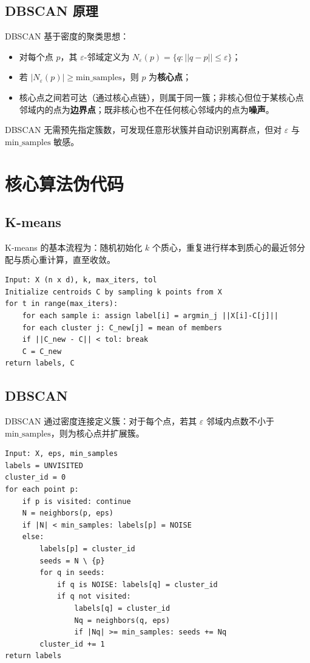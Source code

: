\subsection{DBSCAN 原理}
DBSCAN 基于密度的聚类思想：
\begin{itemize}
    \item 对每个点 $p$，其 $\varepsilon$-邻域定义为 $N_\varepsilon(p)=\{q: ||q-p||\le\varepsilon\}$；
    \item 若 $|N_\varepsilon(p)|\ge\mathrm{min\_samples}$，则 $p$ 为\textbf{核心点}；
    \item 核心点之间若可达（通过核心点链），则属于同一簇；非核心但位于某核心点邻域内的点为\textbf{边界点}；既非核心也不在任何核心邻域内的点为\textbf{噪声}。 
\end{itemize}
DBSCAN 无需预先指定簇数，可发现任意形状簇并自动识别离群点，但对 $\varepsilon$ 与 $\mathrm{min\_samples}$ 敏感。

\section{核心算法伪代码}
\subsection{K-means}
K-means 的基本流程为：随机初始化 $k$ 个质心，重复进行样本到质心的最近邻分配与质心重计算，直至收敛。

\begin{lstlisting}[style=cleanpython]
Input: X (n x d), k, max_iters, tol
Initialize centroids C by sampling k points from X
for t in range(max_iters):
    for each sample i: assign label[i] = argmin_j ||X[i]-C[j]||
    for each cluster j: C_new[j] = mean of members
    if ||C_new - C|| < tol: break
    C = C_new
return labels, C
\end{lstlisting}

\subsection{DBSCAN}
DBSCAN 通过密度连接定义簇：对于每个点，若其 $\varepsilon$ 邻域内点数不小于 $\mathrm{min\_samples}$，则为核心点并扩展簇。
\begin{lstlisting}[style=cleanpython]
Input: X, eps, min_samples
labels = UNVISITED
cluster_id = 0
for each point p:
    if p is visited: continue
    N = neighbors(p, eps)
    if |N| < min_samples: labels[p] = NOISE
    else:
        labels[p] = cluster_id
        seeds = N \ {p}
        for q in seeds:
            if q is NOISE: labels[q] = cluster_id
            if q not visited:
                labels[q] = cluster_id
                Nq = neighbors(q, eps)
                if |Nq| >= min_samples: seeds += Nq
        cluster_id += 1
return labels
\end{lstlisting}

